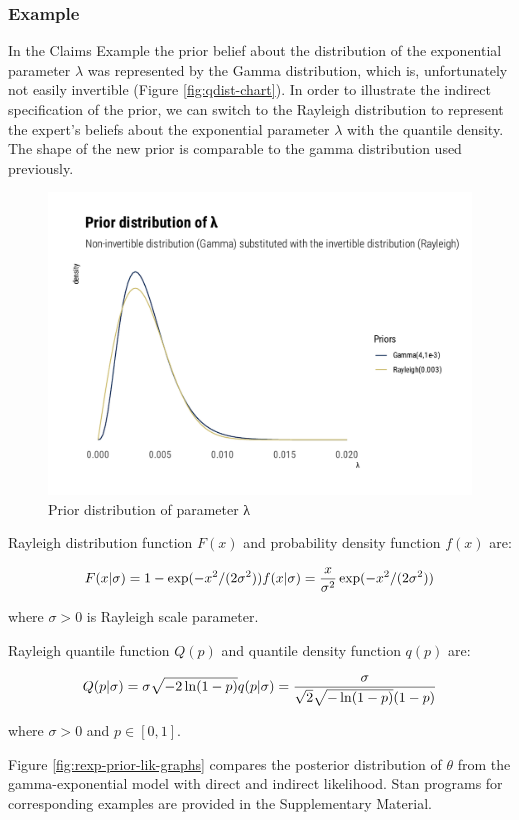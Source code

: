 \documentclass[
  12pt,
]{article}
\begin{document}
\hypertarget{example-1}{%
\subsubsection{Example}\label{example-1}}

In the Claims Example the prior belief about the distribution of the exponential parameter \(\lambda\) was represented by the Gamma distribution, which is, unfortunately not easily invertible (Figure \ref{fig:qdist-chart}). In order to illustrate the indirect specification of the prior, we can switch to the Rayleigh distribution to represent the expert's beliefs about the exponential parameter \(\lambda\) with the quantile density. The shape of the new prior is comparable to the gamma distribution used previously.

\begin{figure}

{\centering \includegraphics[width=0.5\linewidth]{ilbm_article_files/figure-latex/gamma-ray-prior-graph-1} 

}

\caption{Prior distribution of parameter λ}\label{fig:gamma-ray-prior-graph}
\end{figure}

Rayleigh distribution function \(F(x)\) and probability density function \(f(x)\) are:

\[ 
F(x|\sigma) = 1-\exp(-x^2/(2\sigma^2)) \\ 
f(x|\sigma) = \frac{x}{\sigma^2}\exp(-x^2/(2\sigma^2))
\]

where \(\sigma>0\) is Rayleigh scale parameter.

Rayleigh quantile function \(Q(p)\) and quantile density function \(q(p)\) are:

\[
Q(p|\sigma)=\sigma\sqrt{-2\ln(1-p)} \\ 
q(p|\sigma)=\frac{\sigma}{\sqrt{2}\sqrt{-\ln(1-p)}(1-p)}
\]

where \(\sigma>0\) and \(p \in [0,1]\).

Figure \ref{fig:rexp-prior-lik-graphs} compares the posterior distribution of \(\theta\) from the gamma-exponential model with direct and indirect likelihood. Stan programs for corresponding examples are provided in the Supplementary Material.
\end{document}
